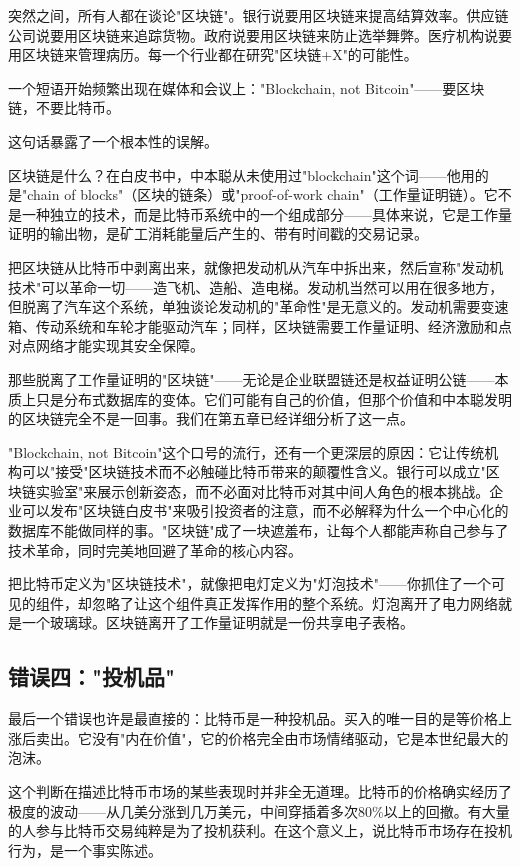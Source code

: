 \documentclass[a4paper,12pt,openany]{ctexbook}
\begin{document}
突然之间，所有人都在谈论"区块链"。银行说要用区块链来提高结算效率。供应链公司说要用区块链来追踪货物。政府说要用区块链来防止选举舞弊。医疗机构说要用区块链来管理病历。每一个行业都在研究"区块链+X"的可能性。

一个短语开始频繁出现在媒体和会议上："Blockchain, not Bitcoin"——要区块链，不要比特币。

这句话暴露了一个根本性的误解。

区块链是什么？在白皮书中，中本聪从未使用过"blockchain"这个词——他用的是"chain of blocks"（区块的链条）或"proof-of-work chain"（工作量证明链）。它不是一种独立的技术，而是比特币系统中的一个组成部分——具体来说，它是工作量证明的输出物，是矿工消耗能量后产生的、带有时间戳的交易记录。

把区块链从比特币中剥离出来，就像把发动机从汽车中拆出来，然后宣称"发动机技术"可以革命一切——造飞机、造船、造电梯。发动机当然可以用在很多地方，但脱离了汽车这个系统，单独谈论发动机的"革命性"是无意义的。发动机需要变速箱、传动系统和车轮才能驱动汽车；同样，区块链需要工作量证明、经济激励和点对点网络才能实现其安全保障。

那些脱离了工作量证明的"区块链"——无论是企业联盟链还是权益证明公链——本质上只是分布式数据库的变体。它们可能有自己的价值，但那个价值和中本聪发明的区块链完全不是一回事。我们在第五章已经详细分析了这一点。

"Blockchain, not Bitcoin"这个口号的流行，还有一个更深层的原因：它让传统机构可以"接受"区块链技术而不必触碰比特币带来的颠覆性含义。银行可以成立"区块链实验室"来展示创新姿态，而不必面对比特币对其中间人角色的根本挑战。企业可以发布"区块链白皮书"来吸引投资者的注意，而不必解释为什么一个中心化的数据库不能做同样的事。"区块链"成了一块遮羞布，让每个人都能声称自己参与了技术革命，同时完美地回避了革命的核心内容。

把比特币定义为"区块链技术"，就像把电灯定义为"灯泡技术"——你抓住了一个可见的组件，却忽略了让这个组件真正发挥作用的整个系统。灯泡离开了电力网络就是一个玻璃球。区块链离开了工作量证明就是一份共享电子表格。


\subsection*{错误四："投机品"}


最后一个错误也许是最直接的：比特币是一种投机品。买入的唯一目的是等价格上涨后卖出。它没有"内在价值"，它的价格完全由市场情绪驱动，它是本世纪最大的泡沫。

这个判断在描述比特币市场的某些表现时并非全无道理。比特币的价格确实经历了极度的波动——从几美分涨到几万美元，中间穿插着多次80\%以上的回撤。有大量的人参与比特币交易纯粹是为了投机获利。在这个意义上，说比特币市场存在投机行为，是一个事实陈述。
\end{document}
